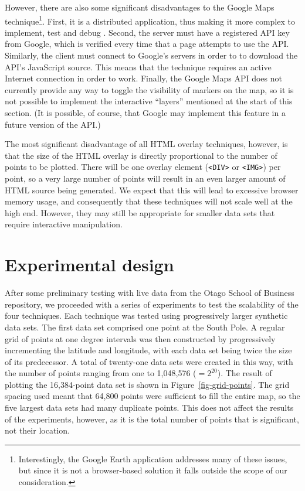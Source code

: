 \documentclass[acmnow]{acmtrans2m}
\begin{document}
However, there are also some significant disadvantages to the Google
Maps technique\footnote{Interestingly, the Google Earth application
addresses many of these issues, but since it is not a browser-based
solution it falls outside the scope of our consideration.}. First, it is
a distributed application, thus making it more complex to implement,
test and debug \cite{Bates-PC-1995-distdebug,Ensl-PH-1978-distributed}.
Second, the server must have a registered API key from Google, which is
verified every time that a page attempts to use the API. Similarly, the
client must connect to Google's servers in order to to download the
API's JavaScript source. This means that the technique requires an
active Internet connection in order to work. Finally, the Google Maps
API does not currently provide any way to toggle the visibility of
markers on the map, so it is not possible to implement the interactive
``layers'' mentioned at the start of this section. (It is possible, of
course, that Google may implement this feature in a future version of
the API.)

The most significant disadvantage of all HTML overlay techniques,
however, is that the size of the HTML overlay is directly proportional
to the number of points to be plotted. There will be one overlay element
(\verb|<DIV>| or \verb|<IMG>|) per point, so a very large number of
points will result in an even larger amount of HTML source being
generated. We expect that this will lead to excessive browser memory
usage, and consequently that these techniques will not scale well at the
high end. However, they may still be appropriate for smaller data sets
that require interactive manipulation.


\section{Experimental design}
\label{sec-experiment}

After some preliminary testing with live data from the Otago School of
Business repository, we proceeded with a series of experiments to test
the scalability of the four techniques. Each technique was tested using
progressively larger synthetic data sets. The first data set comprised
one point at the South Pole. A regular grid of points at one degree
intervals was then constructed by progressively incrementing the
latitude and longitude, with each data set being twice the size of its
predecessor. A total of twenty-one data sets were created in this way,
with the number of points ranging from one to 1,048,576 (\(=2^{20}\)).
The result of plotting the 16,384-point data set is shown in
Figure~\ref{fig-grid-points}. The grid spacing used meant that 64,800
points were sufficient to fill the entire map, so the five largest data
sets had many duplicate points. This does not affect the results of the
experiments, however, as it is the total number of points that is
significant, not their location.
\end{document}
